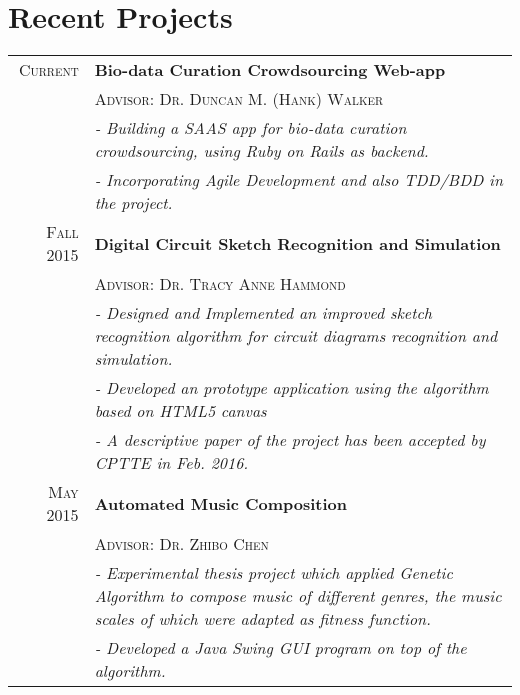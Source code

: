 \documentclass[a4paper,10pt]{article}
\begin{document}
\section{Recent Projects}
\begin{longtable}{rp{12cm}}	

    \textsc{Current}
    &\textbf{Bio-data Curation Crowdsourcing Web-app}\\
    &\textsc{Advisor: Dr. Duncan M. (Hank) Walker}\\
    &\textit{- Building a SAAS app for bio-data curation crowdsourcing, using Ruby on Rails as backend.}\\
    &\textit{- Incorporating Agile Development and also TDD/BDD in the project.}
    
    \\
    
    \textsc{Fall 2015}
    &\textbf{Digital Circuit Sketch Recognition and Simulation}\\
    &\textsc{Advisor: Dr. Tracy Anne Hammond}\\
    &\textit{- Designed and Implemented an improved sketch recognition algorithm for circuit diagrams recognition and simulation.}\\
    &\textit{- Developed an prototype application using the algorithm based on HTML5 canvas}\\
    &\textit{- A descriptive paper of the project has been accepted by CPTTE in Feb. 2016.}
    
    \\
    
    
    \textsc{May 2015}
    &\textbf{Automated Music Composition}\\
    &\textsc{Advisor: Dr. Zhibo Chen}\\
    &\textit{- Experimental thesis project which applied Genetic Algorithm to compose music of different genres, the music scales of which were adapted as fitness function.}\\
    &\textit{- Developed a Java Swing GUI program on top of the algorithm.}

\end{longtable}



\end{document}
